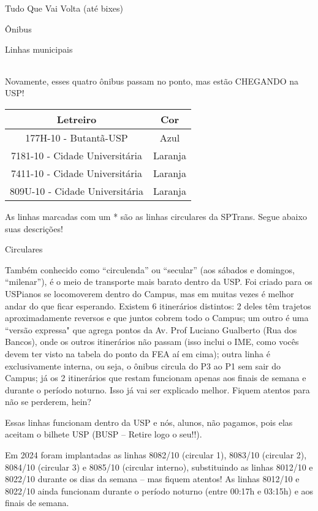 \begin{secao}{Tudo Que Vai Volta (até bixes)}
\begin{subsecao}{Ônibus}
\begin{subsubsecao}{Linhas municipais}
\begin{center}
\begin{tabular}{|c|c|c|}
      \hline
	\end{tabular}
\end{center}

Novamente, esses quatro ônibus passam no ponto, mas estão CHEGANDO na USP!
\begin{center}
	\begin{tabular}{|c|c|}
	  \hline
	  Letreiro & Cor\\
	  \hline
	  177H-10 - Butantã-USP & Azul\\
	  7181-10 - Cidade Universitária & Laranja\\
	  7411-10 - Cidade Universitária & Laranja\\
	  809U-10 - Cidade Universitária & Laranja\\
	  \hline
	\end{tabular}
\end{center}

As linhas marcadas com um * são as linhas circulares da SPTrans.
Segue abaixo suas descrições!

\end{subsubsecao}

\begin{subsubsecao}{Circulares}

Também conhecido como ``circulenda'' ou ``secular'' (aos sábados e domingos,
``milenar''), é o meio de transporte mais barato dentro da USP. Foi criado para
os USPianos se locomoverem dentro do Campus, mas em muitas vezes é melhor andar
do que ficar esperando. Existem 6 itinerários distintos: 2 deles têm trajetos
aproximadamente reversos e que juntos cobrem todo o Campus; um outro é uma
``versão expressa" que agrega pontos da Av. Prof Luciano Gualberto (Rua dos 
Bancos), onde os outros itinerários não passam (isso inclui o IME, como vocês 
devem ter visto na tabela do ponto da FEA aí em cima); outra linha é exclusivamente 
interna, ou seja, o ônibus circula do P3 ao P1 sem sair do Campus; já os 2 itinerários 
que restam funcionam apenas aos finais de semana e durante o período noturno. Isso já 
vai ser explicado melhor. Fiquem atentos para não se perderem, hein?

Essas linhas funcionam dentro da USP e nós, alunos, não pagamos, pois elas aceitam o 
bilhete USP (BUSP -- Retire logo o seu!!).

Em 2024 foram implantadas as linhas 8082/10 (circular 1), 8083/10 (circular 2), 
8084/10 (circular 3) e 8085/10 (circular interno), substituindo as linhas 8012/10 e 
8022/10 durante os dias da semana -- mas fiquem atentos! As linhas 8012/10 e 8022/10 
ainda funcionam durante o período noturno (entre 00:17h e 03:15h) e aos finais de semana. 


\end{subsubsecao}
\end{subsecao}
\end{secao}
